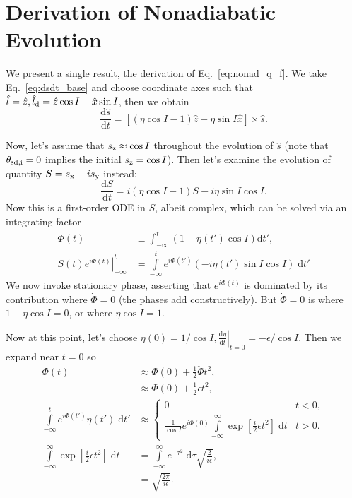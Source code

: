 \documentclass[
        fleqn,
        usenatbib,
        referee,
    ]{mnras}
\newcommand*{\rd}[2]{\frac{\mathrm{d}#1}{\mathrm{d}#2}}
\newcommand*{\at}[1]{\left.#1\right|}
\newcommand*{\p}[1]{\left(#1\right)}
\newcommand*{\s}[1]{\left[#1\right]}
\begin{document}
\section{Derivation of Nonadiabatic Evolution}\label{s:nonad_app}

We present a single result, the derivation of Eq.~\eqref{eq:nonad_q_f}. We take
Eq.~\eqref{eq:dsdt_base} and choose coordinate axes such that $\hat{l} = \hat{z},
\hat{l}_{\rm d} = \hat{z} \cos I + \hat{x}\sin I$, then we obtain
\begin{equation}
    \rd{\hat{s}}{t} = \s{
        \p{\eta \cos I - 1}\hat{z} + \eta \sin I \hat{x}} \times \hat{s}.
\end{equation}

Now, let's assume that $s_{\rm z} \approx \cos I$ throughout the evolution of
$\hat{s}$ (note that $\theta_{\rm sd, i} = 0$ implies the initial $s_{\rm z} = \cos
I$). Then let's examine the evolution of quantity $S = s_{\rm x} + is_{\rm y}$ instead:
\begin{equation}
    \rd{S}{t} = i\p{\eta\cos I - 1}S - i \eta \sin I\cos I.\label{eq:nonad_ode}
\end{equation}
Now this is a first-order ODE in $S$, albeit complex, which can be solved via
an integrating factor
\begin{align}
    \Phi(t) &\equiv \int_{-\infty}^t \p{1 - \eta(t') \cos I}
        \mathrm{d}t',\\
    \at{S(t) e^{i\Phi(t)}}_{-\infty}^t
        &= \int\limits_{-\infty}^t e^{i\Phi(t')}
            \p{-i\eta(t')\sin I\cos I}\;\mathrm{d}t'\label{eq:nonad_int}
\end{align}
We now invoke stationary phase, asserting that $e^{i\Phi(t)}$ is dominated by
its contribution where $\dot{\Phi} = 0$ (the phases add constructively). But
$\dot{\Phi} = 0$ is where $1 - \eta\cos I = 0$, or where $\eta\cos I = 1$.

Now at this point, let's choose $\eta(0) = 1/\cos I, \at{\rd{\eta}{t}}_{t=0} =
-\epsilon/\cos I$. Then we expand near $t = 0$ so
\begin{align}
    \Phi(t) &\approx \Phi(0) + \frac{1}{2}\ddot{\Phi}t^2,\\
        &\approx \Phi(0) + \frac{1}{2}\epsilon t^2,\\
    \int\limits_{-\infty}^t e^{i\Phi(t')}\eta(t')\;\mathrm{d}t'
        &\approx
        \begin{cases}
            0 & t < 0,\\
            \frac{1}{\cos I}e^{i\Phi(0)}\int\limits_{-\infty}^\infty
                \exp\s{\frac{i}{2}\epsilon t^2}\;\mathrm{d}t
                & t > 0.
        \end{cases}\\
    \int\limits_{-\infty}^\infty
                \exp\s{\frac{i}{2}\epsilon t^2}\;\mathrm{d}t
        &= \int\limits_{-\infty}^\infty e^{-\tau^2}\;\mathrm{d}\tau
            \sqrt{\frac{2}{i\epsilon}},\\
        &= \sqrt{\frac{2\pi}{i\epsilon}}.
\end{align}
\end{document}
